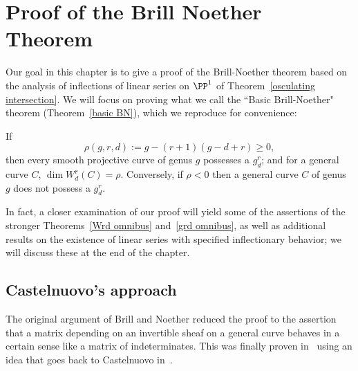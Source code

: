 

\chapter{Proof of the Brill Noether Theorem}\label{Brill Noether proof chapter}
\label{BrillNoetherproofChapter}

Our goal in this chapter is to give a proof of the Brill-Noether theorem based on the analysis
of inflections of linear series on $\PP^{1}$ of Theorem~\ref{osculating intersection}. We will focus on proving what we call the ``Basic Brill-Noether" theorem (Theorem~\ref{basic BN}), which we reproduce for convenience:

\begin{theorem}\label{BN-basic}
If 
 $$
 \rho(g,r,d) := g - (r+1)(g-d+r) \geq 0,
$$
then every smooth projective curve of genus $g$  possesses a $g^r_d$; and for a general curve $C$,  $\dim W^r_d(C) = \rho$. Conversely, if $\rho < 0$ then a general curve $C$ of genus $g$ does not possess a $g^r_d$.
\end{theorem}

In fact, a closer examination of our proof will yield some of the assertions of the stronger Theorems~\ref{Wrd omnibus} and~\ref{grd omnibus}, as well as additional results on the existence of linear series with specified inflectionary behavior; we will discuss these at the end of the chapter.


\section{Castelnuovo's approach}

The original argument of Brill and Noether reduced the proof to the assertion that a matrix depending
on an invertible sheaf on a general curve
behaves in a certain sense like a matrix of indeterminates. This was finally proven in~\cite{Griffiths-Harris-BN} using an idea that goes back to Castelnuovo in~\cite{zbMATH02692307}.

